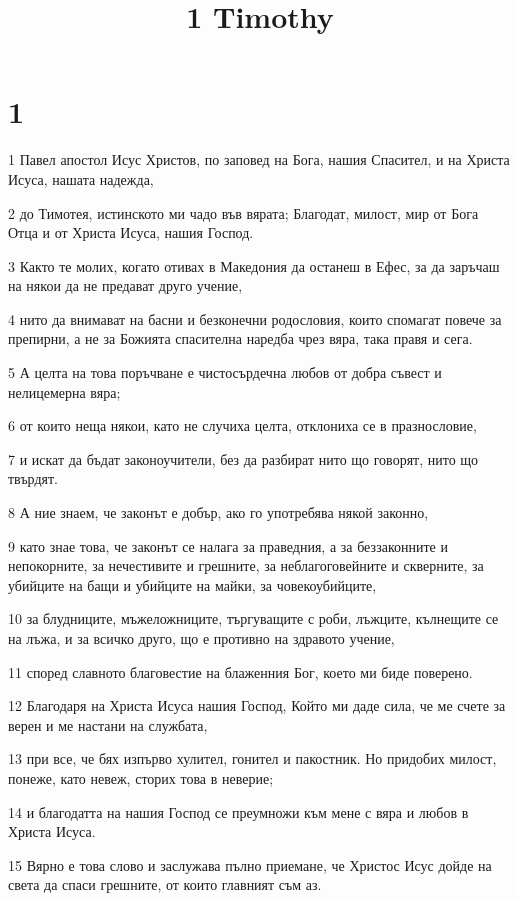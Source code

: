 

\title{1 Timothy}


\chapter{1}

\par 1 Павел апостол Исус Христов, по заповед на Бога, нашия Спасител, и на Христа Исуса, нашата надежда,
\par 2 до Тимотея, истинското ми чадо във вярата; Благодат, милост, мир от Бога Отца и от Христа Исуса, нашия Господ.
\par 3 Както те молих, когато отивах в Македония да останеш в Ефес, за да заръчаш на някои да не предават друго учение,
\par 4 нито да внимават на басни и безконечни родословия, които спомагат повече за препирни, а не за Божията спасителна наредба чрез вяра, така правя и сега.
\par 5 А целта на това поръчване е чистосърдечна любов от добра съвест и нелицемерна вяра;
\par 6 от които неща някои, като не случиха целта, отклониха се в празнословие,
\par 7 и искат да бъдат законоучители, без да разбират нито що говорят, нито що твърдят.
\par 8 А ние знаем, че законът е добър, ако го употребява някой законно,
\par 9 като знае това, че законът се налага за праведния, а за беззаконните и непокорните, за нечестивите и грешните, за неблагоговейните и скверните, за убийците на бащи и убийците на майки, за човекоубийците,
\par 10 за блудниците, мъжеложниците, търгуващите с роби, лъжците, кълнещите се на лъжа, и за всичко друго, що е противно на здравото учение,
\par 11 според славното благовестие на блаженния Бог, което ми биде поверено.
\par 12 Благодаря на Христа Исуса нашия Господ, Който ми даде сила, че ме счете за верен и ме настани на службата,
\par 13 при все, че бях изпърво хулител, гонител и пакостник. Но придобих милост, понеже, като невеж, сторих това в неверие;
\par 14 и благодатта на нашия Господ се преумножи към мене с вяра и любов в Христа Исуса.
\par 15 Вярно е това слово и заслужава пълно приемане, че Христос Исус дойде на света да спаси грешните, от които главният съм аз.
